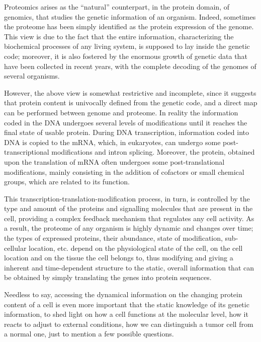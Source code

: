Proteomics arises as the ``natural'' counterpart, in the protein domain, of
genomics, that studies the genetic information of an organism.
Indeed,  sometimes the proteome has been simply identified as the protein
expression of the genome\cite{wilkins1996b,hochstrasser1998}. This view  is due
to the fact that the entire information, characterizing
the biochemical processes of any living system, is supposed 
to lay inside the genetic code; moreover, it is also fostered by the  enormous
growth of genetic data that have been collected in recent years, with the
complete decoding of the genomes of several organisms.

However, the above view is somewhat restrictive and incomplete, since it
suggests that protein content is
univocally defined from the genetic code, and a direct map can be performed
between genome and proteome.
In reality the information coded in the DNA undergoes several levels 
of modifications until it reaches the final state of usable protein.
During DNA transcription, information coded into DNA is copied to the mRNA,
which, in eukaryotes, can
undergo some post-transcriptional modifications  and intron splicing.
Moreover, the protein, obtained upon the translation of mRNA often undergoes 
some post-translational modifications, mainly consisting in the addition of cofactors
or  small chemical groups, which are related to its function.

This transcription-translation-modification process, in turn, is controlled by
the type and amount of the proteins and signalling molecules that are present in
the cell, providing a complex feedback mechanism that regulates any cell
activity. As a result,
the proteome of any organism is highly dynamic and changes over time; the types of
expressed proteins, their abundance, state of modification, sub-cellular location,
etc. depend on the physiological state of the cell, on the cell location
and on the tissue the cell belongs to, thus modifying and
giving a inherent and time-dependent structure to the static, overall
information that can be obtained by simply translating the genes into protein
sequences.

Needless to say, accessing the dynamical information on the changing protein
content of a cell is even more important that the static knowledge of its
genetic information, to shed light on how a cell functions at the molecular
level, how it reacts to adjust to external conditions, how we can distinguish  a
tumor cell from a normal one, just to mention a few possible questions.


